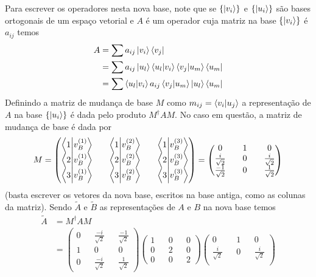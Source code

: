 \documentclass[a4paper, 12pt, notitlepage]{article}
\begin{document}
\begin{enumerate}
\begin{enumerate}[(A)]
  Para escrever os operadores nesta nova base, note que se $\{\ket{v_i}\}$ e $\{\ket{u_i}\}$ são bases ortogonais de um espaço vetorial e $A$ é um operador cuja matriz na base $\{\ket{v_i}\}$ é $a_{ij}$ temos
  \begin{align*}
  A &= \sum a_{ij} \ket{v_i}\bra{v_j} \\
  &= \sum a_{ij} \ket{u_l}\bra{u_l}\ket{v_i}\bra{v_j}\ket{u_m}\bra{u_m} \\
  &= \sum \bra{u_l}\ket{v_i} a_{ij} \bra{v_j}\ket{u_m} \ket{u_l}\bra{u_m}
  \end{align*}
  Definindo a matriz de mudança de base $M$ como $m_{ij} = \bra{v_i}\ket{u_j}$ a representação de $A$ na base $\{\ket{u_i}\}$ é dada pelo produto $M^\dagger A M$. No caso em questão, a matriz de mudança de base é dada por
  \[ M = \begin{pmatrix} 
  \bra{1}\ket{v_B^{(1)}} && \bra{1}\ket{v_B^{(2)}} && \bra{1}\ket{v_B^{(3)}} \\
  \bra{2}\ket{v_B^{(1)}} && \bra{2}\ket{v_B^{(2)}} && \bra{2}\ket{v_B^{(3)}} \\
  \bra{3}\ket{v_B^{(1)}} && \bra{3}\ket{v_B^{(2)}} && \bra{3}\ket{v_B^{(3)}}
  \end{pmatrix} =
  \begin{pmatrix}
  0 && 1 && 0 \\
  \frac{i}{\sqrt{2}} && 0 && \frac{i}{\sqrt{2}} \\
  \frac{-1}{\sqrt{2}} && 0 && \frac{1}{\sqrt{2}}
  \end{pmatrix}
  \]
  \noindent (basta escrever os vetores da nova base, escritos na base antiga, como as colunas da matriz). Sendo $\tilde{A}$ e $\tilde{B}$ as representações de $A$ e $B$ na nova base temos
  \begin{align*}
  \tilde{A} &= M^\dagger A M \\
  &= 
  \begin{pmatrix}
  0 && \frac{-i}{\sqrt{2}} && \frac{-1}{\sqrt{2}} \\
  1 && 0 && 0 \\
  0 && \frac{-i}{\sqrt{2}} && \frac{1}{\sqrt{2}}
  \end{pmatrix}\begin{pmatrix}
  1 && 0 && 0 \\
  0 && 2 && 0 \\
  0 && 0 && 2
  \end{pmatrix}\begin{pmatrix}
  0 && 1 && 0 \\
  \frac{i}{\sqrt{2}} && 0 && \frac{i}{\sqrt{2}} \\

\end{pmatrix}
\end{align*}
\end{enumerate}
\end{enumerate}
\end{document}
